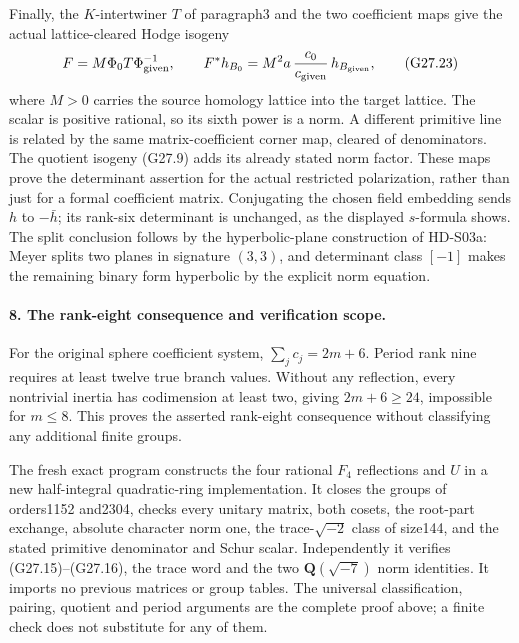 Finally, the \(K\)-intertwiner \(T\) of paragraph3 and
the two coefficient maps give the actual lattice-cleared
Hodge isogeny
\[
 F=M\Phi_0T\Phi_{\rm given}^{-1},\qquad
       F^*h_{B_0}=M^2a\,\frac{c_0}{c_{\rm given}}\,
                                    h_{B_{\rm given}},
                                                               \tag{G27.23}
\]
where \(M>0\) carries the source homology lattice into
the target lattice. The scalar is positive rational,
so its sixth power is a norm. A different primitive line
is related by the same matrix-coefficient corner map,
cleared of denominators. The quotient isogeny (G27.9)
adds its already stated norm factor. These maps prove
the determinant assertion for the actual restricted
polarization, rather than just for a formal coefficient
matrix. Conjugating the chosen field embedding sends
\(h\) to \(-\bar h\); its rank-six determinant is unchanged,
as the displayed \(s\)-formula shows.
The split conclusion follows by the hyperbolic-plane
construction of HD-S03a: Meyer splits two planes in
signature \((3,3)\), and determinant class \([-1]\)
makes the remaining binary form hyperbolic by the
explicit norm equation.

\paragraph{8. The rank-eight consequence and verification scope.}
For the original sphere coefficient system,
\(\sum_jc_j=2m+6\). Period rank nine requires at least
twelve true branch values. Without any reflection, every
nontrivial inertia has codimension at least two, giving
\(2m+6\ge24\), impossible for \(m\le8\).
This proves the asserted rank-eight consequence without
classifying any additional finite groups.

The fresh exact program
constructs the four rational \(F_4\) reflections and \(U\)
in a new half-integral quadratic-ring implementation.
It closes the groups of orders1152 and2304, checks
every unitary matrix, both cosets, the root-part exchange,
absolute character norm one, the trace-\(\sqrt{-2}\)
class of size144, and the stated primitive denominator
and Schur scalar. Independently it verifies (G27.15)--(G27.16),
the trace word and the two \(\mathbf Q(\sqrt{-7})\) norm
identities. It imports no previous matrices or group tables.
The universal classification, pairing, quotient and period
arguments are the complete proof above; a finite check
does not substitute for any of them.
